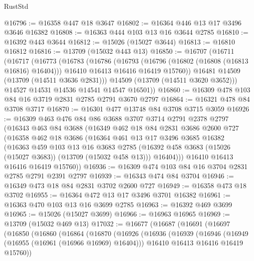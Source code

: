\begin{lexlean}{RustStd}
\begin{coremodule}
@16796 := @16358 @447 @18 @3647
@16802 := @16364 @446 @13 @17 @3496 @3646 @16382
@16808 := @16363 @444 @103 @13 @16 @3644 @2785
@16810 := @16392 @443 @3644
@16812 := @15026 (@15027 @3644)
@16813 := @16810 @16812
@16816 := @13709 (@15032 @443 @13)
@16850 := @16707
    (@16711
      (@16717
        (@16773
          (@16783
            (@16786
              (@16793
                (@16796 (@16802 (@16808 (@16813 @16816) @16404)))
                @16410
                @16413
                @16416
                @16419
                @15760))
            @16481
            @14509
            (@13709 (@14511 @3636 @2831)))
          @14509
          (@13709 (@14511 @3620 @3652)))
        @14527
        @14531
        @14536
        @14541
        @14547
        @16501))
@16860 := @16309 @478 @103 @84 @16 @3719 @2831 @2785 @2791 @3670 @2797
@16864 := @16321 @478 @84 @3708 @3717
@16870 := @16301 @477 @13748 @84 @3708 @3715 @3059
@16926 := @16309
    @463
    @476
    @84
    @86
    @3688
    @3707
    @3714
    @2791
    @2378
    @2797
    (@16343
      @463
      @84
      @3688
      (@16349
        @462
        @18
        @84
        @2831
        @3686
        @2600
        @727
        (@16358
          @462
          @18
          @3686
          (@16364
            @461
            @13
            @17
            @3496
            @3685
            @16382
            (@16363
              @459
              @103
              @13
              @16
              @3683
              @2785
              (@16392 @458 @3683 (@15026 (@15027 @3683)) (@13709 (@15032 @458 @13)))
              @16404)))
        @16410
        @16413
        @16416
        @16419
        @15760))
@16936 := @16309 @474 @103 @84 @16 @3704 @2831 @2785 @2791 @2391 @2797
@16939 := @16343 @474 @84 @3704
@16946 := @16349 @473 @18 @84 @2831 @3702 @2600 @727
@16949 := @16358 @473 @18 @3702
@16955 := @16364 @472 @13 @17 @3496 @3701 @16382
@16961 := @16363 @470 @103 @13 @16 @3699 @2785
@16963 := @16392 @469 @3699
@16965 := @15026 (@15027 @3699)
@16966 := @16963 @16965
@16969 := @13709 (@15032 @469 @13)
@17032 := @16677
    (@16687
      (@16691
        (@16697
          (@16850
            (@16860
              (@16864
                (@16870
                  (@16926
                    (@16936
                      (@16939
                        (@16946
                          (@16949 (@16955 (@16961 (@16966 @16969) @16404)))
                          @16410
                          @16413
                          @16416
                          @16419
                          @15760))

\end{coremodule}
\end{lexlean}
